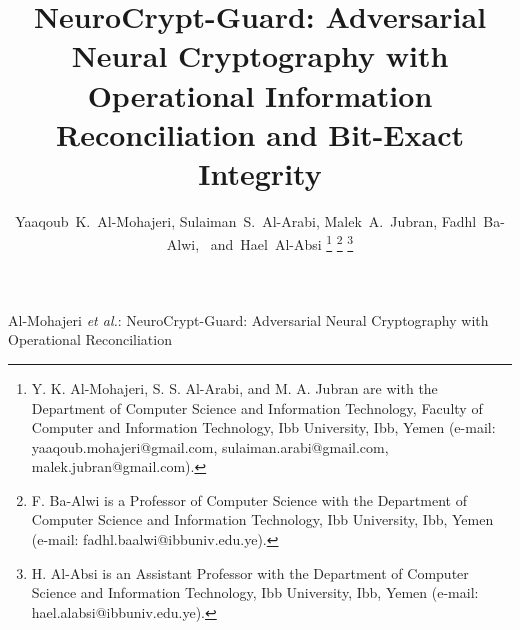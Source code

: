 \documentclass[journal,10pt,twocolumn]{IEEEtran}
\begin{document}
\title{NeuroCrypt-Guard: Adversarial Neural Cryptography with Operational Information Reconciliation and Bit-Exact Integrity}

\author{Yaaqoub~K.~Al-Mohajeri,
        Sulaiman~S.~Al-Arabi,
        Malek~A.~Jubran,
        Fadhl~Ba-Alwi,~
        and~Hael~Al-Absi%
\thanks{Y. K. Al-Mohajeri, S. S. Al-Arabi, and M. A. Jubran are with the Department of Computer Science and Information Technology, Faculty of Computer and Information Technology, Ibb University, Ibb, Yemen (e-mail: yaaqoub.mohajeri@gmail.com, sulaiman.arabi@gmail.com, malek.jubran@gmail.com).}%
\thanks{F. Ba-Alwi is a Professor of Computer Science with the Department of Computer Science and Information Technology, Ibb University, Ibb, Yemen (e-mail: fadhl.baalwi@ibbuniv.edu.ye).}%
\thanks{H. Al-Absi is an Assistant Professor with the Department of Computer Science and Information Technology, Ibb University, Ibb, Yemen (e-mail: hael.alabsi@ibbuniv.edu.ye).}%
}

%
{Al-Mohajeri \MakeLowercase{\textit{et al.}}: NeuroCrypt-Guard: Adversarial Neural Cryptography with Operational Reconciliation}

\maketitle
\end{document}
